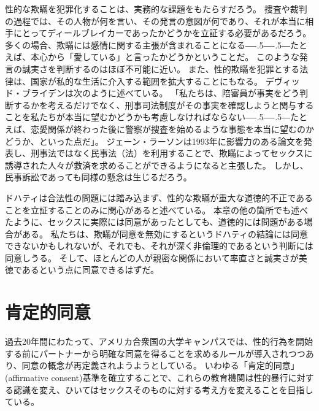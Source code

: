 \documentclass[paper=a4,book,openany]{jlreq}
\def\DDASH{―\kern-.5\zw―\kern-.5\zw―} %
\begin{document}
性的な欺瞞を犯罪化することは、実務的な課題をもたらすだろう。
捜査や裁判の過程では、その人物が何を言い、その発言の意図が何であり、それが本当に相手にとってディールブレイカーであったかどうかを立証する必要があるだろう。
多くの場合、欺瞞には感情に関する主張が含まれることになる{\DDASH}たとえば、本心から「愛している」と言ったかどうかということだ。
このような発言の誠実さを判断するのはほぼ不可能に近い。
また、性的欺瞞を犯罪とする法律は、国家が私的な生活に介入する範囲を拡大することにもなる。
デヴィッド・ブライデンは次のように述べている。
「私たちは、陪審員が事実をどう判断するかを考えるだけでなく、刑事司法制度がその事実を確認しようと関与することを私たちが本当に望むかどうかも考慮しなければならない{\DDASH}たとえば、恋愛関係が終わった後に警察が捜査を始めるような事態を本当に望むのかどうか、といった点だ」\citep[p.469]{bryden00:_redef_rape}。
ジェーン・ラーソンは1993年に影響力のある論文を発表し、刑事法ではなく民事法（法）を利用することで、欺瞞によってセックスに誘導された人々が救済を求めることができるようになると主張した\citep{larson93:_women_under_so_littl_they}。
しかし、民事訴訟であっても同様の懸念は生じるだろう。

ドハティは合法性の問題には踏み込まず、性的な欺瞞が重大な道徳的不正であることを立証することのみに関心があると述べている。
本章の他の箇所でも述べたように、セックスに実際には同意があったとしても、道徳的には問題がある場合がある。
私たちは、欺瞞が同意を無効にするというドハティの結論には同意できないかもしれないが、それでも、それが深く非倫理的であるという判断には同意しうる。
そして、ほとんどの人が親密な関係において率直さと誠実さが美徳であるという点に同意できるはずだ。

\section{肯定的同意}

過去20年間にわたって、アメリカ合衆国の大学キャンパスでは、性的行為を開始する前にパートナーから明確な同意を得ることを求めるルールが導入されつつあり、同意の概念が再定義されようようとしている。
いわゆる「肯定的同意」(affirmative consent)基準を確立することで、これらの教育機関は性的暴行に対する認識を変え、ひいてはセックスそのものに対する考え方を変えることを目指している。
\end{document}
